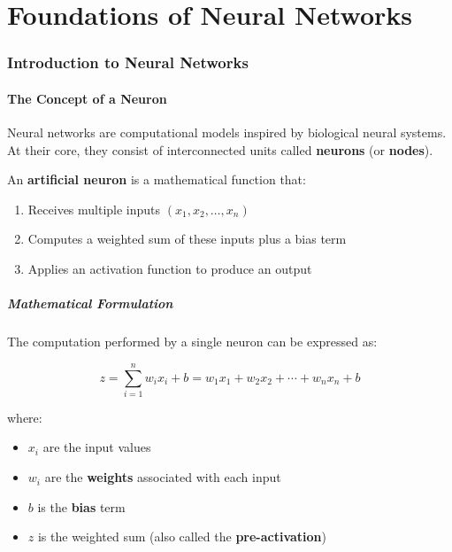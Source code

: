 \documentclass[11pt,a4paper]{article}
\theoremstyle{definition}
\theoremstyle{plain}
\theoremstyle{remark}
\begin{document}
\newpage
\tableofcontents
\newpage


\part{Foundations of Neural Networks}

\section{Introduction to Neural Networks}

\subsection{The Concept of a Neuron}

Neural networks are computational models inspired by biological neural systems. At their core, they consist of interconnected units called \textbf{neurons} (or \textbf{nodes}).

\begin{tcolorbox}[colback=blue!5!white,colframe=blue!75!black,title=\textbf{Definition: Artificial Neuron}]
An \textbf{artificial neuron} is a mathematical function that:
\begin{enumerate}
    \item Receives multiple inputs $(x_1, x_2, \dots, x_n)$
    \item Computes a weighted sum of these inputs plus a bias term
    \item Applies an activation function to produce an output
\end{enumerate}
\end{tcolorbox}

\subsubsection{Mathematical Formulation}

The computation performed by a single neuron can be expressed as:

\[
z = \sum_{i=1}^{n} w_i x_i + b = w_1 x_1 + w_2 x_2 + \cdots + w_n x_n + b
\]

where:
\begin{itemize}
    \item $x_i$ are the input values
    \item $w_i$ are the \textbf{weights} associated with each input
    \item $b$ is the \textbf{bias} term
    \item $z$ is the weighted sum (also called the \textbf{pre-activation})
\end{itemize}
\end{document}
